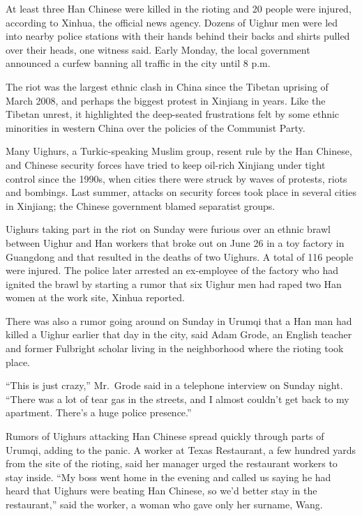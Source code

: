 ﻿\documentclass[12pt]{article}
\begin{document}
At least three Han Chinese were killed in the rioting and 20 people were injured, according to
Xinhua, the official news agency. Dozens of Uighur men were led into nearby police stations with
their hands behind their backs and shirts pulled over their heads, one witness said. Early Monday,
the local government announced a curfew banning all traffic in the city until 8 p.m.

The riot was the largest ethnic clash in China since the Tibetan uprising of March 2008, and perhaps
the biggest protest in Xinjiang in years. Like the Tibetan unrest, it highlighted the deep-seated
frustrations felt by some ethnic minorities in western China over the policies of the Communist
Party.

Many Uighurs, a Turkic-speaking Muslim group, resent rule by the Han Chinese, and Chinese security
forces have tried to keep oil-rich Xinjiang under tight control since the 1990s, when cities there
were struck by waves of protests, riots and bombings. Last summer, attacks on security forces took
place in several cities in Xinjiang; the Chinese government blamed separatist groups.

Uighurs taking part in the riot on Sunday were furious over an ethnic brawl between Uighur and Han
workers that broke out on June 26 in a toy factory in Guangdong and that resulted in the deaths of
two Uighurs. A total of 116 people were injured. The police later arrested an ex-employee of the
factory who had ignited the brawl by starting a rumor that six Uighur men had raped two Han women at
the work site, Xinhua reported.

There was also a rumor going around on Sunday in Urumqi that a Han man had killed a Uighur earlier
that day in the city, said Adam Grode, an English teacher and former Fulbright scholar living in the
neighborhood where the rioting took place.

``This is just crazy,'' Mr.~Grode said in a telephone interview on Sunday night. ``There was a lot
of tear gas in the streets, and I almost couldn't get back to my apartment. There's a huge police
presence.''

Rumors of Uighurs attacking Han Chinese spread quickly through parts of Urumqi, adding to the panic.
A worker at Texas Restaurant, a few hundred yards from the site of the rioting, said her manager
urged the restaurant workers to stay inside. ``My boss went home in the evening and called us saying
he had heard that Uighurs were beating Han Chinese, so we'd better stay in the restaurant,'' said
the worker, a woman who gave only her surname, Wang.
\end{document}
